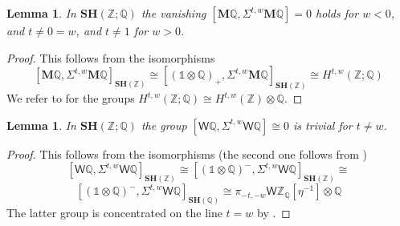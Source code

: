 \documentclass[11pt,hyp,english]{article}
\newcommand{\Z}{\mathbb{Z}}
\newcommand{\Q}{\mathbb{Q}}
\newcommand{\unit}{\mathds{1}}
\newcommand{\HQ}{\mathbf{M}\Q}
\newcommand{\cHQ}{{\wt{\mathbf{M}}}{\Q}}
\newcommand{\SH}{\mathbf{SH}}
\newcommand{\tensor}{\otimes}
\newcommand{\wt}[1]{\widetilde{#1}}
\newtheorem{lemma}[theorem]{Lemma}
\theoremstyle{definition}
\begin{document}
\begin{lemma}
\label{lemma:Qd1zero}
In $\SH(\Z;\Q)$ the vanishing 
$ 
[\HQ, \Sigma^{t,w}\HQ] = 
0
$
holds for $w < 0$, and $t\neq 0=w$, and $t\neq 1$ for $w>0$.
\end{lemma}
\begin{proof}
This follows from the isomorphisms 
\[
[\HQ,\Sigma^{t,w}\HQ]_{\SH(\Z)}\cong [(\unit\tensor \Q)_+,\Sigma^{t,w}\HQ]_{\SH(\Z)}\cong H^{t,w}(\Z;\Q)
\]
We refer to  for the groups $H^{t,w}(\Z;\Q)\cong H^{t,w}(\Z)\otimes\Q$.
\end{proof}

\begin{lemma}
\label{lemma:Qd1zero-part2}
In $\SH(\Z;\Q)$ the group $[\mathsf{W}\Q, \Sigma^{t,w}\mathsf{W}\Q]\cong 0$ is trivial for $t\neq w$.
\end{lemma}
\begin{proof}
This follows from the isomorphisms (the second one follows from \cite[Lemma 2.2]{dfjk})
\[
[\mathsf{W}\Q,\Sigma^{t,w}\mathsf{W}\Q]_{\SH(\Z)}\cong
[(\unit\otimes \Q)^-,\Sigma^{t,w}\mathsf{W}\Q]_{\SH(\Z)} \cong 
\]
\[
[(\unit\tensor \Q)^-,\Sigma^{t,w}\mathsf{W}\Q]_{\SH(\Q)} \cong 
\pi_{-t,-w}\mathsf{W}\Z_\Q[\eta^{-1}]\otimes \Q
\]
The latter group is concentrated on the line $t=w$ by .
\end{proof}
\end{document}
